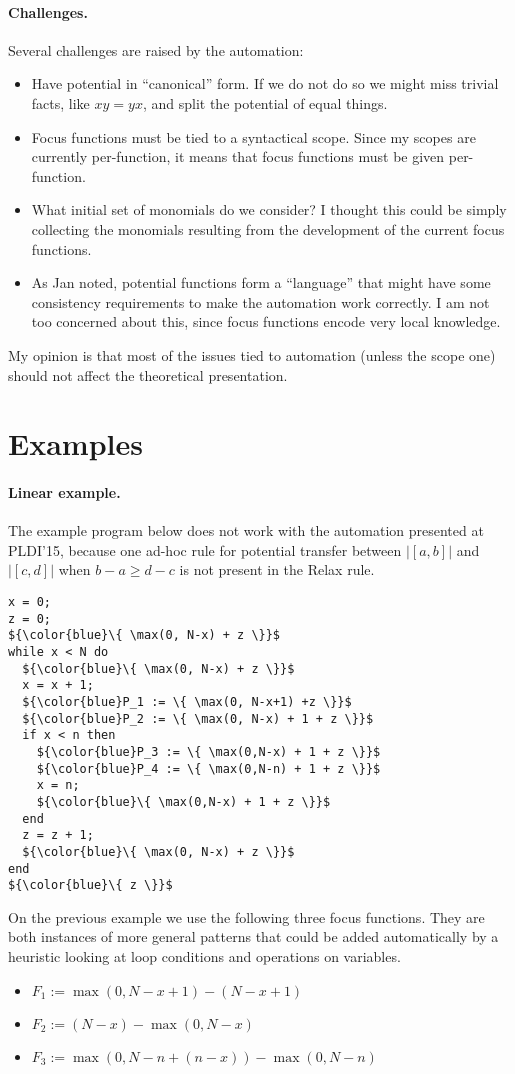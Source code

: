 \documentclass[nocopyrightspace,preprint]{sigplanconf-pldi15}
\begin{document}
\paragraph{Challenges.}
Several challenges are raised by the automation:

\begin{itemize}
\item Have potential in ``canonical'' form.  If we do not do
  so we might miss trivial facts, like $xy = yx$, and split
  the potential of equal things.
\item Focus functions must be tied to a syntactical scope.
  Since my scopes are currently per-function, it means that focus
  functions must be given per-function.
\item What initial set of monomials do we consider?  I thought
  this could be simply collecting the monomials resulting from the
  development of the current focus functions.
\item As Jan noted, potential functions form a ``language'' that
  might have some consistency requirements to make the automation
  work correctly.  I am not too concerned about this, since focus
  functions encode very local knowledge.
\end{itemize}

My opinion is that most of the issues tied to automation (unless
the scope one) should not affect the theoretical presentation.

\section{Examples}

\paragraph{Linear example.}  The example program below does not
work with the automation presented at PLDI'15, because one ad-hoc
rule for potential transfer between $|[a,b]|$ and $|[c,d]|$ when
$b-a \ge d-c$ is not present in the {\sc Relax} rule.

\begin{lstlisting}[mathescape]
x = 0;
z = 0;
${\color{blue}\{ \max(0, N-x) + z \}}$
while x < N do
  ${\color{blue}\{ \max(0, N-x) + z \}}$
  x = x + 1;
  ${\color{blue}P_1 := \{ \max(0, N-x+1) +z \}}$
  ${\color{blue}P_2 := \{ \max(0, N-x) + 1 + z \}}$
  if x < n then
    ${\color{blue}P_3 := \{ \max(0,N-x) + 1 + z \}}$
    ${\color{blue}P_4 := \{ \max(0,N-n) + 1 + z \}}$
    x = n;
    ${\color{blue}\{ \max(0,N-x) + 1 + z \}}$
  end
  z = z + 1;
  ${\color{blue}\{ \max(0, N-x) + z \}}$
end
${\color{blue}\{ z \}}$
\end{lstlisting}
%
On the previous example we use the following three focus
functions.  They are both instances of more general patterns
that could be added automatically by a heuristic looking at
loop conditions and operations on variables.
\begin{itemize}
\item $F_1 := \max(0, N-x+1) - (N-x+1)$
\item $F_2 := (N-x) - \max(0, N-x)$
\item $F_3 := \max(0, N-n + (n-x)) - \max(0,N-n)$
\end{itemize}
\end{document}
